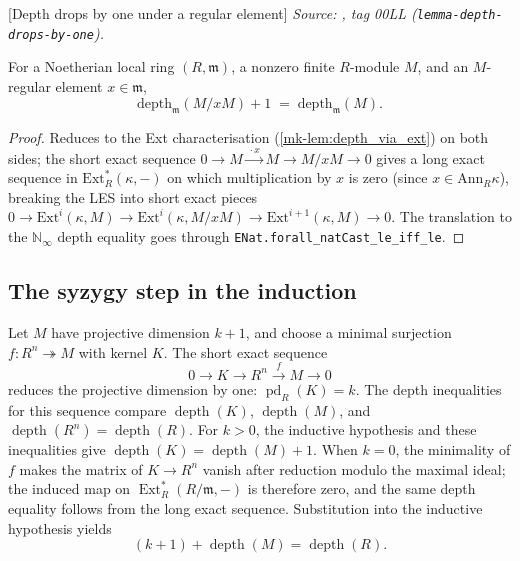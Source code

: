 \begin{lemma}

  [Depth drops by one under a regular element]
  \label{mk-lem:depth_drops_by_one}
  \textit{Source: \cite{stacks-project}, tag 00LL (\texttt{lemma-depth-drops-by-one}).}

  For a Noetherian local ring \((R, \mathfrak m)\), a nonzero finite
  \(R\)-module \(M\), and an \(M\)-regular element \(x \in \mathfrak m\),
  \[
    \text{depth}_{\mathfrak m}(M/xM) + 1 \;=\; \text{depth}_{\mathfrak m}(M).
  \]
\end{lemma}
\begin{proof}

  Reduces to the Ext characterisation
  (\ref{mk-lem:depth_via_ext}) on both sides; the short exact sequence
  \(0 \to M \xrightarrow{\,\cdot x\,} M \to M/xM \to 0\) gives a
  long exact sequence in \(\text{Ext}^*_R(\kappa, -)\) on which
  multiplication by \(x\) is zero (since \(x \in \text{Ann}_R \kappa\)),
  breaking the LES into short exact pieces
  \(0 \to \text{Ext}^i(\kappa, M) \to \text{Ext}^i(\kappa, M/xM) \to
  \text{Ext}^{i+1}(\kappa, M) \to 0\). The translation to the
  \(\mathbb N_\infty\) depth equality goes through
  \texttt{ENat.forall\_natCast\_le\_iff\_le}.
\end{proof}

\subsection{The syzygy step in the induction}
\label{mk-subsec:succ_pd_gap_sequence}

Let \(M\) have projective dimension \(k+1\), and choose a minimal surjection
\(f : R^n \twoheadrightarrow M\) with kernel \(K\). The short exact sequence
\[
  0 \longrightarrow K \longrightarrow R^n \xrightarrow{f} M \longrightarrow 0
\]
reduces the projective dimension by one: \(\operatorname{pd}_R(K)=k\).
The depth inequalities for this sequence compare
\(\operatorname{depth}(K)\), \(\operatorname{depth}(M)\), and
\(\operatorname{depth}(R^n)=\operatorname{depth}(R)\). For \(k>0\), the
inductive hypothesis and these inequalities give
\(\operatorname{depth}(K)=\operatorname{depth}(M)+1\). When \(k=0\), the
minimality of \(f\) makes the matrix of \(K\to R^n\) vanish after reduction
modulo the maximal ideal; the induced map on
\(\operatorname{Ext}^*_R(R/\mathfrak m,-)\) is therefore zero, and the same
depth equality follows from the long exact sequence. Substitution into the
inductive hypothesis yields
\[
  (k+1)+\operatorname{depth}(M)=\operatorname{depth}(R).
\]


